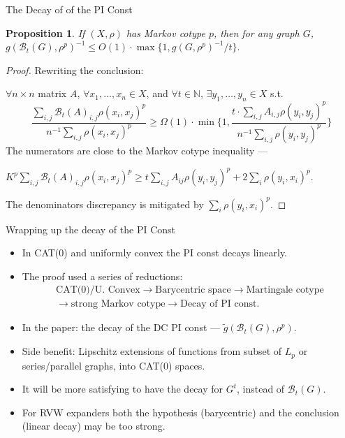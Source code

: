 \documentclass[compress]{beamer}
\newtheorem{proposition}{Proposition}
\begin{document}
\begin{frame}{The Decay of of the PI Const}
\onslide<+->
\begin{proposition}
If $(X,\rho)$ has Markov cotype $p$, then for any graph $G$, \\
\(g(\mathcal B_t(G),\rho^p)^{-1} \le O(1) \cdot \max\{1,g(G,\rho^p)^{-1}/t\} .\)
\end{proposition}
\begin{proof}
Rewriting the conclusion:

$\forall n\times n$ matrix $A$, $\forall x_1,\ldots,x_n\in X$, and $\forall t\in \mathbb N$,
$\exists y_1,\ldots, y_n\in X$ s.t.
\[ \frac{\sum_{i,j} \mathcal B_t(A)_{i,j} \rho(x_i,x_j)^p}{n^{-1} \sum_{i,j} \rho(x_i,x_j)^p} \ge
\Omega(1) \cdot \min \biggl \{1, \frac{ t\cdot \sum_{i,j}  A_{i,j} \rho(y_i,y_j)^p}{n^{-1} \sum_{i,j} \rho(y_i,y_j)^p} \biggr \}
\]
The numerators are close to the Markov cotype inequality ---

\smallskip
\begin{center}
\(  K^p\sum_{i,j}
 \mathcal B_t(A)_{i,j} \rho(x_i,x_j)^p \ge 
t \text{$\sum_{i,j}$} A_{ij}\rho(y_i,y_j)^p+ 2\sum_i\rho(y_i,x_i)^p .\)
\end{center}
\smallskip

The denominators discrepancy is mitigated by $\sum_i \rho(y_i,x_i)^p$.
\end{proof}

\end{frame}

\begin{frame}{Wrapping up the decay of the PI Const}

\begin{itemize}[<+->]
\item In  CAT(0) and uniformly convex  the PI const decays linearly.
\item The proof used a series of reductions: 
\begin{multline*}
 \text{CAT(0)/U. Convex} \longrightarrow \text{Barycentric space} \longrightarrow \text{Martingale cotype}\\
 \longrightarrow \text{strong Markov cotype} \longrightarrow \text{Decay of PI const.}
 \end{multline*}
\item In the paper: the decay of the DC PI const --- $\tilde g(\mathcal B_t(G),\rho^p)$.
\item Side benefit: Lipschitz extensions of functions from subset of $L_p$ or series/parallel graphs, into CAT(0) spaces.
\item It will be more satisfying to have the decay for $G^t$,  instead of $\mathcal B_t(G)$.
\item For RVW expanders both the hypothesis (barycentric) and the conclusion (\alert{linear} decay) may be too strong.
\end{itemize}
\end{frame}
\end{document}
